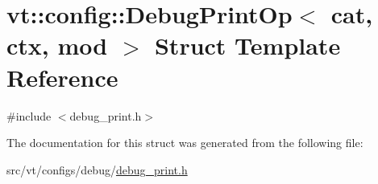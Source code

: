 \hypertarget{structvt_1_1config_1_1_debug_print_op}{}\section{vt\+:\+:config\+:\+:Debug\+Print\+Op$<$ cat, ctx, mod $>$ Struct Template Reference}
\label{structvt_1_1config_1_1_debug_print_op}


{\ttfamily \#include $<$debug\+\_\+print.\+h$>$}



The documentation for this struct was generated from the following file\+:\begin{DoxyCompactItemize}
\item 
src/vt/configs/debug/\hyperlink{debug__print_8h}{debug\+\_\+print.\+h}\end{DoxyCompactItemize}

